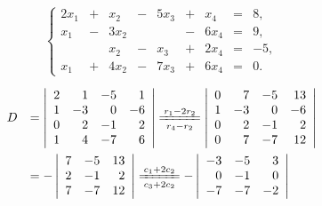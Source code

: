 \begin{li}
  $$\left\{
    \begin{array}{rcrcrcrcr}
      2x_1 &+ & x_2 &- & 5x_3&+ & x_4 &= & 8, \\[0.2cm]
      x_1 &- & 3x_2&  &     &- & 6x_4& = & 9, \\[0.2cm]
           &  & x_2 &- & x_3 &+ & 2x_4 &= & -5, \\[0.2cm]
      x_1 &+ & 4x_2&-& 7x_3 &+& 6x_4 &= & 0.
    \end{array}
  \right.
  $$
\end{li}

\begin{jie}
  $$
  \begin{array}{ll}
    D &= \left|
        \begin{array}{rrrr}
          2 &  1 & -5 &  1\\
          1 & -3 &  0 & -6\\
          0 &  2 & -1 &  2\\
          1 &  4 & -7 &  6
        \end{array}
                        \right|
                        \xlongequal[r_4-r_2]{r_1-2r_2}
                        \left|
                        \begin{array}{rrrr}
                          0 &  7 & -5 & 13\\
                          1 & -3 &  0 & -6\\
                          0 &  2 & -1 &  2\\
                          0 &  7 & -7 & 12
                        \end{array}
                                        \right|\\[0.8cm]
      & = - \left|
        \begin{array}{rrr}
          7  & -5 & 13\\
          2  & -1 &  2\\
          7  & -7 & 12
        \end{array}
                    \right|
                    \xlongequal[c_3+2c_2]{c_1+2c_2}
                    - \left|
                    \begin{array}{rrr}
                      -3  & -5 &  3\\
                      0  & -1 &  0\\
                      -7 & -7 & -2
                    \end{array}
                                \right|\\[0.8cm]

\end{array}$$
\end{jie}
